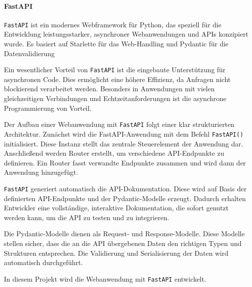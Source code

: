 \documentclass[12pt, letterpaper]{article}
\begin{document}
  \paragraph{FastAPI}
  \par \textbf{}
  \par \texttt{FastAPI} \cite{fastapidoc} ist ein modernes Webframework für Python, das speziell für die Entwicklung leistungsstarker, asynchroner Webanwendungen und APIs konzipiert wurde. Es basiert auf Starlette für das Web-Handling und Pydantic für die Datenvalidierung
  \par Ein wesentlicher Vorteil von \texttt{FastAPI} ist die eingebaute Unterstützung für asynchronen Code. Dies ermöglicht eine höhere Effizienz, da Anfragen nicht blockierend verarbeitet werden. Besonders in Anwendungen mit vielen gleichzeitigen Verbindungen und Echtzeitanforderungen ist die asynchrone Programmierung von Vorteil.
  \par Der Aufbau einer Webanwendung mit \texttt{FastAPI} folgt einer klar strukturierten Architektur. Zunächst wird die FastAPI-Anwendung mit dem Befehl \texttt{FastAPI()} initialisiert. Diese Instanz stellt das zentrale Steuerelement der Anwendung dar. Anschließend werden Router erstellt, um verschiedene API-Endpunkte zu definieren. Ein Router fasst verwandte Endpunkte zusammen und wird dann der Anwendung hinzugefügt.
  \par \texttt{FastAPI} generiert automatisch die API-Dokumentation. Diese wird auf Basis der definierten API-Endpunkte und der Pydantic-Modelle erzeugt. Dadurch erhalten Entwickler eine vollständige, interaktive Dokumentation, die sofort genutzt werden kann, um die API zu testen und zu integrieren.
  \par Die Pydantic-Modelle dienen als Request- und Response-Modelle. Diese Modelle stellen sicher, dass die an die API übergebenen Daten den richtigen Typen und Strukturen entsprechen. Die Validierung und Serialisierung der Daten wird automatisch durchgeführt.
  \par In diesem Projekt wird die Webanwendung mit \texttt{FastAPI} entwickelt. 
\end{document}
